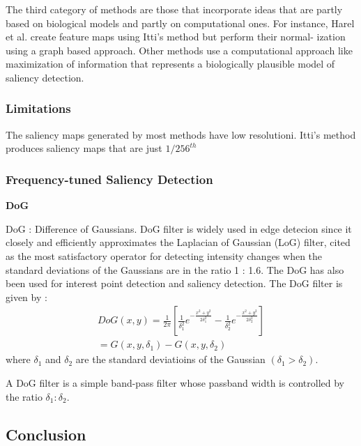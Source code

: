 The third category of methods are those that incorporate
ideas that are partly based on biological models and partly
on computational ones. For instance, Harel et al. create
feature maps using Itti’s method but perform their normal-
ization using a graph based approach. Other methods use
a computational approach like maximization of information
 that represents a biologically plausible model of saliency
detection.
\subsubsection*{Limitations}
The saliency maps generated by most methods have low resolutioni. Itti's method produces saliency maps that are just $1/{256^{th}}$

\subsubsection*{Frequency-tuned Saliency Detection}
\textbf{DoG}

DoG : Difference of Gaussians.  DoG filter is widely used in edge detecion since it closely and efficiently approximates the Laplacian of Gaussian (LoG) filter, cited as the most satisfactory operator for detecting intensity changes when the standard deviations of the Gaussians are in the ratio 1 : 1.6. The DoG has also been used for interest point detection and  saliency detection.  The DoG filter is given by : 
\begin{equation}
\begin{gathered}
DoG(x, y) = \frac{1}{2\pi}\left[
\frac{1}{\delta_1^2}e^{-\frac{x^2 + y^2}{2\delta_1^2}} - 
\frac{1}{\delta_2^2}e^{-\frac{x^2 + y^2}{2\delta_2^2}}
\right]\\
= G(x, y, \delta_1) - G(x, y, \delta_2)
\end{gathered}
\end{equation}
where $\delta_1$ and $\delta_2$ are the standard deviatioins of the Gaussian $(\delta_1 > \delta_2)$.

A DoG filter is a simple band-pass filter whose passband
width is controlled by the ratio $\delta_1 : \delta_2$. 
\subsection{Conclusion}
